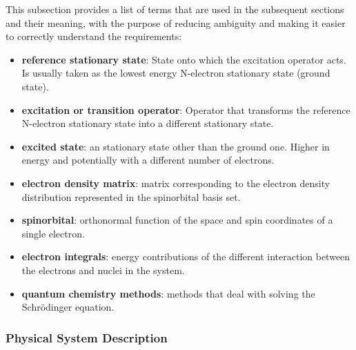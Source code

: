 \documentclass[12pt]{article}
\begin{document}
This subsection provides a list of terms that are used in the subsequent
sections and their meaning, with the purpose of reducing ambiguity and making it
easier to correctly understand the requirements:

\begin{itemize}

\item \textbf{reference stationary state}: State onto which the excitation 
operator acts. Is usually taken as the lowest energy N-electron stationary 
state (ground 
state).
\item \textbf{excitation or transition operator}: Operator that transforms the 
reference N-electron stationary state into a different stationary state.
\item \textbf{excited state}: an stationary state other than the ground one. 
Higher in 
energy and potentially with a different number of electrons.
\item \textbf{electron density matrix}: matrix corresponding to the electron 
density distribution represented in the spinorbital basis set.
\item \textbf{spinorbital}: orthonormal function of the space and spin 
coordinates of a single electron.
\item \textbf{electron integrals}: energy contributions of the different 
interaction between the electrons and nuclei in the system.
\item \textbf{quantum chemistry methods}: methods that deal with solving the 
Schr\"odinger equation.

\end{itemize}

\subsubsection{Physical System Description} \label{sec_phySystDescrip}

\end{document}
